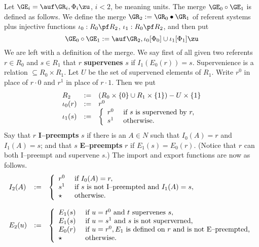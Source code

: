 Let $\GE_i = \auf \GR_i, \Phi_i\zu$, $i < 2$,
be meaning units. The merge $\GE_0 \circ \GE_1$ is defined as
follows. We define the merge $\GR_2 := \GR_0 \bullet \GR_1$ of
referent systems plus injective functions $\iota_0 : R_0 \pf R_2$,
$\iota_1 : R_0 \pf R_2$, and then put
$$\GE_0 \circ \GE_1 := \auf \GR_2, \iota_0[\Phi_0] \cup
    \iota_1[\Phi_1]\zu$$
We are left with a definition of the merge. We say first
of all given two referents $r \in R_0$ and $s \in R_1$ that
$r$ {\bf supervenes} $s$ if $I_1(E_0(r)) = s$. Supervenience
is a relation $\subseteq R_0 \times R_1$. Let $U$ be the set
of supervened elements of $R_1$. Write $r^0$ in place of
$r \cdot 0$ and $r^1$ in place of $r \cdot 1$. Then we put
$$\begin{array}{l@{\quad := \quad}l}
R_2 & (R_0 \times \{0\} \cup R_1 \times \{1\}) - U \times \{1\} \\
\iota_0(r) & r^0 \\
\iota_1(s) & \left\{\begin{array}{ll}
        r^0 & \mbox{ if } s \mbox{ is supervened by } r, \\
        s^1 & \mbox{ otherwise.}
            \end{array}\right.
\end{array}$$
Say that $r$ {\bf I--preempts} $s$ if there is an $A \in N$
such that $I_0(A) = r$ and $I_1(A) = s$; and
that $s$ {\bf E--preempts} $r$ if $E_1(s) = E_0(r)$. (Notice that
$r$ can both I--preempt and supervene $s$.) The import and export
functions are now as follows.
$$\begin{array}{l@{\quad := \quad}l}
I_2(A) & \left\{\begin{array}{ll}
            r^0 & \mbox{ if } I_0(A) = r, \\
            s^1 & \mbox{ if } s \mbox{ is not I--preempted and }
                I_1(A) = s, \\
            \star & \mbox{ otherwise.}
                \end{array}\right. \\
\multicolumn{2}{l}{} \\
E_2(u) & \left\{\begin{array}{ll}
            E_1(s) & \mbox{ if } u = t^0 \mbox{ and }
                t \mbox{ supervenes } s, \\
            E_1(s) & \mbox{ if } u = s^1 \mbox{ and
                $s$ is not superverned, } \\
            E_0(r) & \mbox{ if } u = r^0,
                E_1 \mbox{ is defined on }r
                \mbox{ and is not E--preempted,} \\
            \star & \mbox{ otherwise.}
            \end{array}\right.
\end{array}$$
